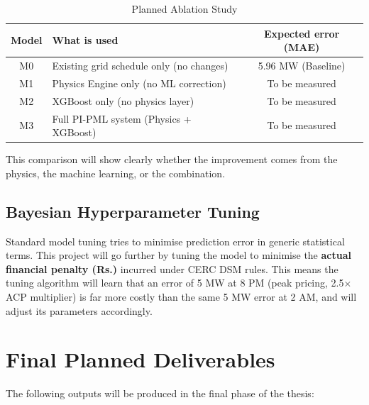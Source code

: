 \documentclass[12pt,a4paper]{report}
\begin{document}
\begin{table}[H]
    \centering
    \caption{Planned Ablation Study}
    \begin{tabular}{clc}
        \toprule
        \textbf{Model} & \textbf{What is used} & \textbf{Expected error (MAE)} \\
        \midrule
        M0 & Existing grid schedule only (no changes) & 5.96 MW (Baseline) \\
        M1 & Physics Engine only (no ML correction) & To be measured \\
        M2 & XGBoost only (no physics layer) & To be measured \\
        M3 & Full PI-PML system (Physics + XGBoost) & To be measured \\
        \bottomrule
    \end{tabular}
\end{table}

This comparison will show clearly whether the improvement comes from the physics, the machine learning, or the combination.

\section{Bayesian Hyperparameter Tuning}

Standard model tuning tries to minimise prediction error in generic statistical terms. This project will go further by tuning the model to minimise the \textbf{actual financial penalty (Rs.)} incurred under CERC DSM rules. This means the tuning algorithm will learn that an error of 5 MW at 8 PM (peak pricing, 2.5$\times$ ACP multiplier) is far more costly than the same 5 MW error at 2 AM, and will adjust its parameters accordingly.

\chapter{Final Planned Deliverables}

The following outputs will be produced in the final phase of the thesis:
\end{document}
